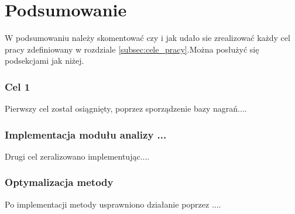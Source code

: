 \section{Podsumowanie}

W podsumowaniu należy skomentować czy i jak udało sie zrealizować każdy cel pracy zdefiniowany w rozdziale \ref{subsec:cele_pracy}.Można posłużyć się podsekcjami jak niżej. 


\subsubsection*{Cel 1}

Pierwszy cel został osiągnięty, poprzez sporządzenie bazy nagrań....

\subsubsection*{Implementacja modułu analizy ...}

Drugi cel zeralizowano implementując....

\subsubsection*{Optymalizacja metody}
Po implementacji metody usprawniono działanie poprzez ....